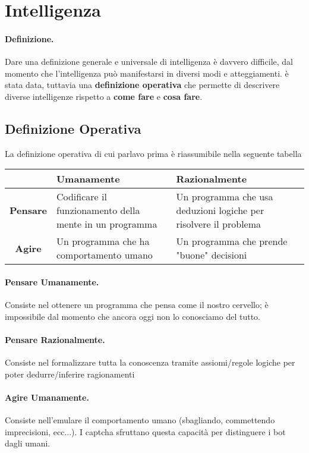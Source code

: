 \section{Intelligenza}
\paragraph{Definizione.}
Dare una definizione generale e universale di intelligenza è davvero difficile, 
dal momento che l'intelligenza può manifestarsi in diversi modi e atteggiamenti. 
è stata data, tuttavia una \textbf{definizione operativa} che permette di descrivere diverse intelligenze rispetto a \textbf{come fare} e \textbf{cosa fare}.
\subsection{Definizione Operativa}
La definizione operativa di cui parlavo prima è riassumibile nella seguente tabella
\begin{table}[h]
    \centering
    \begin{tabular}{|c|p{5cm}|p{5cm}|}
        \hline
         & \textbf{Umanamente} & \textbf{Razionalmente} \\ \hline
        \textbf{Pensare} & Codificare il funzionamento della mente in un programma & Un programma che usa deduzioni logiche per risolvere il problema \\ \hline
        \textbf{Agire} & Un programma che ha comportamento umano & Un programma che prende "buone" decisioni \\ \hline
    \end{tabular}
\end{table}

\paragraph{Pensare Umanamente.} Consiste nel ottenere un programma che pensa come il nostro cervello; 
è impossibile dal momento che ancora oggi non lo conosciamo del tutto.
\paragraph{Pensare Razionalmente.} Consiste nel formalizzare tutta la conoscenza tramite assiomi/regole logiche per poter dedurre/inferire ragionamenti
\paragraph{Agire Umanamente.} Consiste nell'emulare il comportamento umano (sbagliando, commettendo imprecisioni, ecc...). I captcha sfruttano questa capacità per distinguere i bot dagli umani.

